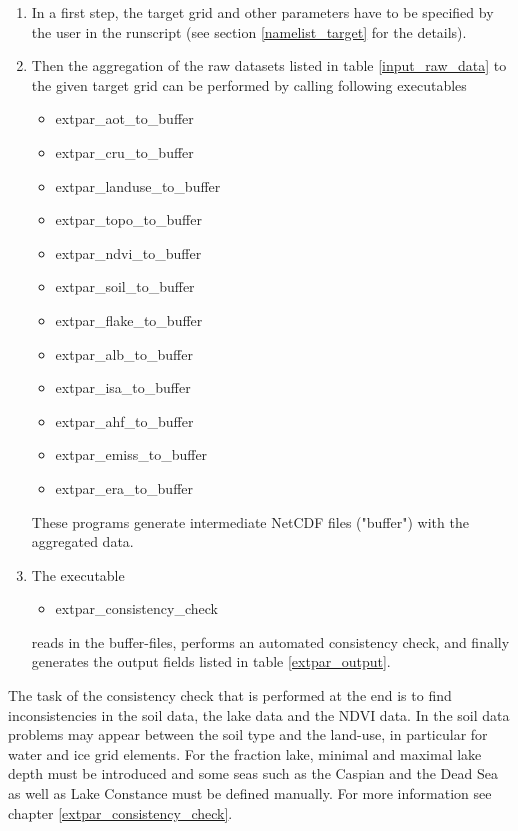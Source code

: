 \documentclass[a4paper,10pt,DIV14,BCOR1cm,titlepage,twoside]{scrartcl}
\begin{document}
\begin{enumerate}
\item In a first step, the target grid and other parameters have to be specified by the user in the runscript (see section \ref{namelist_target} for the details).
\item Then the aggregation of the raw datasets listed in table \ref{input_raw_data} to the given target grid can be performed by calling following executables
  \begin{itemize}
     \item extpar\_aot\_to\_buffer
     \item extpar\_cru\_to\_buffer
     \item extpar\_landuse\_to\_buffer
     \item extpar\_topo\_to\_buffer
     \item extpar\_ndvi\_to\_buffer
     \item extpar\_soil\_to\_buffer
     \item extpar\_flake\_to\_buffer
     \item extpar\_alb\_to\_buffer
     \item extpar\_isa\_to\_buffer
     \item extpar\_ahf\_to\_buffer
     \item extpar\_emiss\_to\_buffer
     \item extpar\_era\_to\_buffer
  \end{itemize}

These programs generate intermediate NetCDF files ("buffer") with the aggregated data.
\item The executable 
\begin{itemize}
     \item extpar\_consistency\_check    
  \end{itemize}
reads in the buffer-files, performs an automated consistency check, and finally generates the output fields listed in table \ref{extpar_output}.
\end{enumerate}

The task of the consistency check that is performed at the end is to find inconsistencies in the soil data, the lake data and the NDVI data. In the soil data problems may appear between the soil type and the land-use, in particular for water and ice grid elements. For the fraction lake, minimal and maximal lake depth must be introduced and some seas such as the Caspian and the Dead Sea as well as Lake Constance must be defined manually. For more information see chapter \ref{extpar_consistency_check}.\par\medskip\noindent
\end{document}
